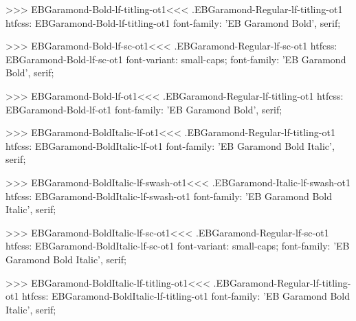 {{{{{{{>>>
\<EBGaramond-Bold-lf-titling-ot1\><<<
.EBGaramond-Regular-lf-titling-ot1
htfcss:  EBGaramond-Bold-lf-titling-ot1  font-family: 'EB Garamond Bold', serif;

>>>
\<EBGaramond-Bold-lf-sc-ot1\><<<
.EBGaramond-Regular-lf-sc-ot1
htfcss:  EBGaramond-Bold-lf-sc-ot1  font-variant: small-caps; font-family: 'EB Garamond Bold', serif;

>>>
\<EBGaramond-Bold-lf-ot1\><<<
.EBGaramond-Regular-lf-titling-ot1
htfcss:  EBGaramond-Bold-lf-ot1  font-family: 'EB Garamond Bold', serif;

>>>
\<EBGaramond-BoldItalic-lf-ot1\><<<
.EBGaramond-Regular-lf-titling-ot1
htfcss:  EBGaramond-BoldItalic-lf-ot1  font-family: 'EB Garamond Bold Italic', serif;

>>>
\<EBGaramond-BoldItalic-lf-swash-ot1\><<<
.EBGaramond-Italic-lf-swash-ot1
htfcss:  EBGaramond-BoldItalic-lf-swash-ot1  font-family: 'EB Garamond Bold Italic', serif;

>>>
\<EBGaramond-BoldItalic-lf-sc-ot1\><<<
.EBGaramond-Regular-lf-sc-ot1
htfcss:  EBGaramond-BoldItalic-lf-sc-ot1  font-variant: small-caps; font-family: 'EB Garamond Bold Italic', serif;

>>>
\<EBGaramond-BoldItalic-lf-titling-ot1\><<<
.EBGaramond-Regular-lf-titling-ot1
htfcss:  EBGaramond-BoldItalic-lf-titling-ot1  font-family: 'EB Garamond Bold Italic', serif;

}}}}}}}
